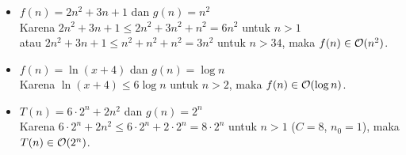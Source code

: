 \documentclass{../praktikum-ppt}
\begin{document}
\begin{frame}
  \frametitle{\insertsection}
  \begin{contoh}
    \begin{itemize}
      \item $f(n) = 2n^2 + 3n + 1$ dan $g(n) = n^2$ \\
      Karena $2n^2 + 3n + 1 \leq 2n^2 + 3n^2 + n^2 = 6n^2$ untuk $n > 1$\\
      atau $2n^2 + 3n + 1 \leq n^2 + n^2 + n^2 = 3n^2$ untuk $n > 34$, maka $f(n) \in \mathcal{O}(n^2)$.
      \item $f(n) = \ln(x+4)$ dan $g(n) = \log n$ \\
      Karena $\ln(x+4) \leq 6\log n$ untuk $n > 2$, maka $f(n) \in \mathcal{O}(\log n)$.
      \item $T(n)=6\cdot 2^n+2n^2$ dan $g(n)=2^n$ \\
      Karena $6\cdot 2^n+2n^2 \leq 6\cdot 2^n+2\cdot 2^n = 8\cdot 2^n$ untuk $n > 1$ ($C=8$, $n_0=1$), maka $T(n) \in \mathcal{O}(2^n)$.
    \end{itemize}
  \end{contoh}
\end{frame}
\end{document}
